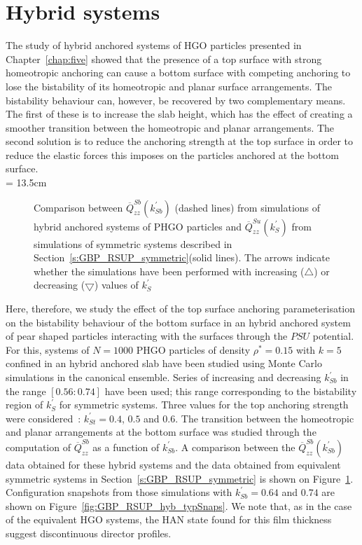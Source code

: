

\section{Hybrid systems}


The study of hybrid anchored systems of HGO particles presented in Chapter~\ref{chap:five} 
showed that the presence of a top surface with strong homeotropic anchoring can cause a 
bottom surface with competing anchoring to lose the bistability of its homeotropic and planar surface
arrangements. The bistability behaviour can, however, be recovered by two complementary means. The
first of these is to increase the slab height, which has the effect of
creating a smoother transition between the homeotropic and planar arrangements. The second
solution is to reduce the anchoring strength at the top surface in order to reduce the elastic
forces this imposes on the particles anchored at the bottom surface.\\

\picW = 13.5cm
\begin{figure}
	\centering
	\caption{Comparison between $\overline{Q}^{Sb}_{zz}(k^\prime_{Sb})$ (dashed lines) from
	simulations of hybrid anchored systems of PHGO particles and
	$\overline{Q}^{Su}_{zz}(k^\prime_{S})$ from simulations of symmetric systems described
	in
	Section~\ref{s:GBP_RSUP_symmetric}(solid lines). The arrows indicate whether the
	simulations have been performed with increasing ($\bigtriangleup$) or 
	decreasing ($\bigtriangledown$) values of $k^\prime_S$}
	\label{fig:GBP_RSUP_hybQzzWaSb}
\end{figure}

Here, therefore, we
study the effect of the top surface anchoring parameterisation on the
bistability behaviour of the bottom surface in an hybrid anchored system of pear shaped
particles interacting with the surfaces through the $PSU$ potential. For this, systems of
$N=1000$ PHGO particles of density $\rho^{*}=0.15$ with $k=5$ confined in an hybrid anchored slab 
have been studied using Monte Carlo simulations in
the canonical ensemble. Series of increasing and decreasing $k^\prime_{Sb}$ in the range
$[0.56:0.74]$ have been used; this range corresponding to the bistability region of $k^\prime_S$
for symmetric systems.
Three values for the top anchoring strength were considered~: 
$k^\prime_{St} = 0.4$, $0.5$ and $0.6$. The transition between the homeotropic and
planar arrangements at the bottom surface was studied through the computation of $\overline{Q}^{Sb}_{zz}$
as a function of $k^\prime_{Sb}$.
A comparison between the $\overline{Q}^{Sb}_{zz}(k^\prime_{Sb})$ data obtained for these hybrid 
systems and the data obtained from equivalent symmetric systems in
Section~\ref{s:GBP_RSUP_symmetric} is shown on Figure~\ref{fig:GBP_RSUP_hybQzzWaSb}.
Configuration snapshots from those simulations with $k^\prime_{Sb} = 0.64$ and $0.74$ are shown
on Figure~\ref{fig:GBP_RSUP_hyb_typSnaps}. We note that, as in the case of the equivalent HGO
systems, the HAN state found for this film thickness suggest discontinuous director profiles.\\

